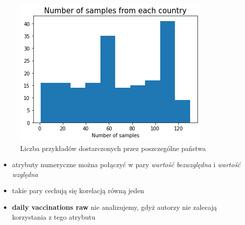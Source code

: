\documentclass[11pt]{beamer}
\begin{document}

\begin{frame}
\begin{figure}[h]
\centering
\includegraphics[scale=0.5]{../img/number_of_samples.png} 
\caption{Liczba przykładów dostarczonych przez poszczególne państwa}
\label{Rys:histogramSamples}
\end{figure}
\end{frame}


\begin{frame}
\begin{itemize}
\item atrybuty numeryczne można połączyć w pary \textit{wartość bezwzględna} i \textit{wartość względna}
\item takie pary cechują się korelacją równą jeden
\item \textbf{daily vaccinations raw} nie analizujemy, gdyż autorzy nie zalecają korzystania z tego atrybutu
\end{itemize}
\end{frame}

\end{document}
